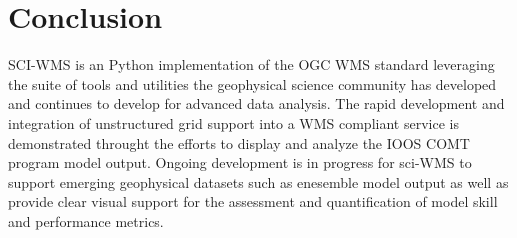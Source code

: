 \documentclass[11pt,twocolumn,twoside]{IEEEtran}
\newcommand{\comt}{COMT}
\newcommand{\ioos}{IOOS}
\newcommand{\sciwms}{SCI-WMS}
\begin{document}
\section{Conclusion}
\sciwms{} is an Python implementation of the OGC WMS standard leveraging
the suite of tools and utilities the geophysical science community has developed and
continues to develop for advanced data analysis. The rapid development and integration
of unstructured grid support into a WMS compliant service is demonstrated throught the
efforts to display and analyze the \ioos{} \comt{} program model output. Ongoing development
is in progress for sci-WMS to support emerging geophysical datasets such as enesemble model
output as well as provide clear visual support for the assessment and quantification of
model skill and performance metrics.



\end{document}
